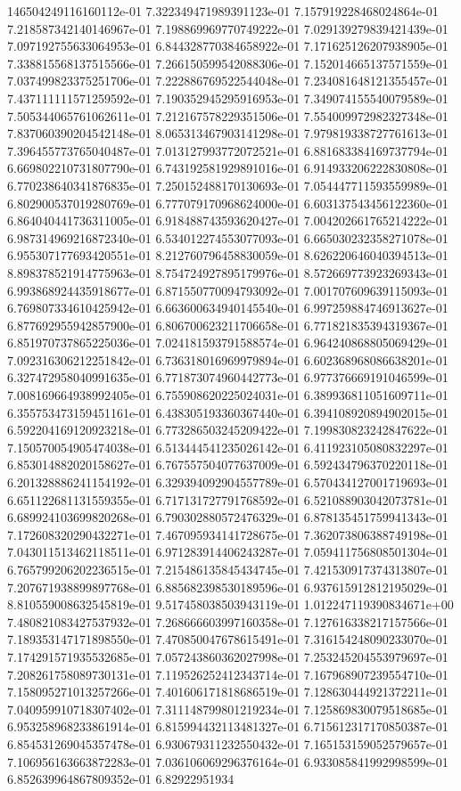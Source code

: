 146504249116160112e-01	7.322349471989391123e-01	7.157919228468024864e-01	7.218587342140146967e-01	7.198869969770749222e-01	7.029139279839421439e-01	7.097192755633064953e-01	6.844328770384658922e-01	7.171625126207938905e-01	7.338815568137515566e-01	7.266150599542088306e-01	7.152014665137571559e-01	7.037499823375251706e-01	7.222886769522544048e-01	7.234081648121355457e-01	7.437111111571259592e-01	7.190352945295916953e-01	7.349074155540079589e-01	7.505344065761062611e-01	7.212167578229351506e-01	7.554009972982327348e-01	7.837060390204542148e-01	8.065313467903141298e-01	7.979819338727761613e-01	7.396455773765040487e-01	7.013127993772072521e-01	6.881683384169737794e-01	6.669802210731807790e-01	6.743192581929891016e-01	6.914933206222830808e-01	6.770238640341876835e-01	7.250152488170130693e-01	7.054447711593559989e-01	6.802900537019280769e-01	6.777079170968624000e-01	6.603137543456122360e-01	6.864040441736311005e-01	6.918488743593620427e-01	7.004202661765214222e-01	6.987314969216872340e-01	6.534012274553077093e-01	6.665030232358271078e-01	6.955307177693420551e-01	8.212760796458830059e-01	8.626220646040394513e-01	8.898378521914775963e-01	8.754724927895179976e-01	8.572669773923269343e-01	6.993868924435918677e-01	6.871550770094793092e-01	7.001707609639115093e-01	6.769807334610425942e-01	6.663600634940145540e-01	6.997259884746913627e-01	6.877692955942857900e-01	6.806700623211706658e-01	6.771821835394319367e-01	6.851970737865225036e-01	7.024181593791588574e-01	6.964240868805069429e-01	7.092316306212251842e-01	6.736318016969979894e-01	6.602368968086638201e-01	6.327472958040991635e-01	6.771873074960442773e-01	6.977376669191046599e-01	7.008169664938992405e-01	6.755908620225024031e-01	6.389936811051609711e-01	6.355753473159451161e-01	6.438305193360367440e-01	6.394108920894902015e-01	6.592204169120923218e-01	6.773286503245209422e-01	7.199830823242847622e-01	7.150570054905474038e-01	6.513444541235026142e-01	6.411923105080832297e-01	6.853014882020158627e-01	6.767557504077637009e-01	6.592434796370220118e-01	6.201328886241154192e-01	6.329394092904557789e-01	6.570434127001719693e-01	6.651122681131559355e-01	6.717131727791768592e-01	6.521088903042073781e-01	6.689924103699820268e-01	6.790302880572476329e-01	6.878135451759941343e-01	7.172608320290432271e-01	7.467095934141728675e-01	7.362073806388749198e-01	7.043011513462118511e-01	6.971283914406243287e-01	7.059411756808501304e-01	6.765799206202236515e-01	7.215486135845434745e-01	7.421530917374313807e-01	7.207671938899897768e-01	6.885682398530189596e-01	6.937615912812195029e-01	8.810559008632545819e-01	9.517458038503943119e-01	1.012247119390834671e+00	7.480821083427537932e-01	7.268666603997160358e-01	7.127616338217157566e-01	7.189353147171898550e-01	7.470850047678615491e-01	7.316154248090233070e-01	7.174291571935532685e-01	7.057243860362027998e-01	7.253245204553979697e-01	7.208261758089730131e-01	7.119526252412343714e-01	7.167968907239554710e-01	7.158095271013257266e-01	7.401606171818686519e-01	7.128630444921372211e-01	7.040959910718307402e-01	7.311148799801219234e-01	7.125869830079518685e-01	6.953258968233861914e-01	6.815994432113481327e-01	6.715612317170850387e-01	6.854531269045357478e-01	6.930679311232550432e-01	7.165153159052579657e-01	7.106956163663872283e-01	7.036106069296376164e-01	6.933085841992998599e-01	6.852639964867809352e-01	6.82922951934